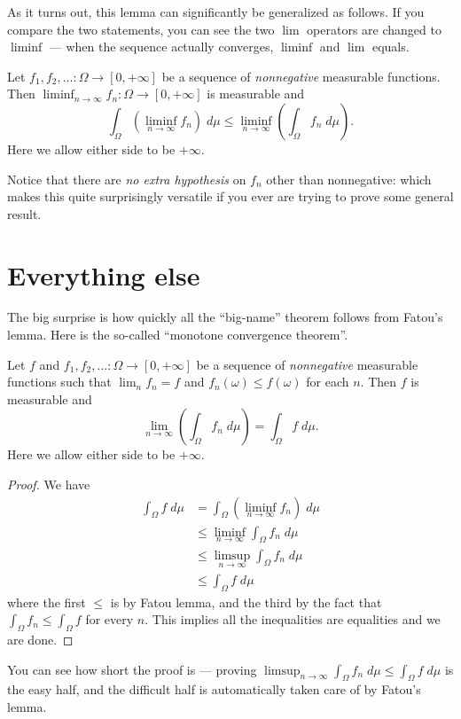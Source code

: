 As it turns out, this lemma can significantly be generalized as follows.
If you compare the two statements, you can see the two $\lim$ operators are changed to $\liminf$ ---
when the sequence actually converges, $\liminf$ and $\lim$ equals.
\begin{lemma}
	Let $f_1, f_2, \dots \colon \Omega \to [0,+\infty]$
	be a sequence of \emph{nonnegative} measurable functions.
	Then $\liminf_{n \to \infty} f_n \colon \Omega \to [0,+\infty]$ is measurable and
	\[ \int_\Omega \left( \liminf_{n \to \infty} f_n \right) \; d\mu
		\le \liminf_{n \to \infty} \left( \int_\Omega f_n \; d\mu \right).  \]
	Here we allow either side to be $+\infty$.
\end{lemma}
Notice that there are \emph{no extra hypothesis}
on $f_n$ other than nonnegative: which makes this quite surprisingly versatile
if you ever are trying to prove some general result.

\section{Everything else}
The big surprise is how quickly all the ``big-name''
theorem follows from Fatou's lemma.
Here is the so-called ``monotone convergence theorem''.
\begin{corollary}
	Let $f$ and $f_1, f_2, \dots \colon \Omega \to [0,+\infty]$
	be a sequence of \emph{nonnegative}
	measurable functions such that $\lim_n f_n = f$
	and $f_n(\omega) \le f(\omega)$ for each $n$.
	Then $f$ is measurable and
	\[ \lim_{n \to \infty} \left( \int_\Omega f_n \; d\mu \right)
		= \int_\Omega f \; d\mu. \]
	Here we allow either side to be $+\infty$.
\end{corollary}
\begin{proof}
	We have
	\begin{align*}
		\int_\Omega f \; d\mu
		&= \int_\Omega \left( \liminf_{n \to \infty} f_n \right) \; d\mu \\
		&\le \liminf_{n \to \infty} \int_\Omega f_n \; d\mu \\
		&\le \limsup_{n \to \infty} \int_\Omega f_n \; d\mu \\
		&\le \int_\Omega f \; d\mu
	\end{align*}
	where the first $\le$ is by Fatou lemma,
	and the third by the fact that
	$\int_\Omega f_n \le \int_\Omega f$ for every $n$.
	This implies all the inequalities are equalities and we are done.
\end{proof}
You can see how short the proof is ---
proving $\limsup_{n \to \infty} \int_\Omega f_n \; d\mu \le \int_\Omega f \; d\mu$ is the easy half,
and the difficult half is automatically taken care of by Fatou's lemma.

